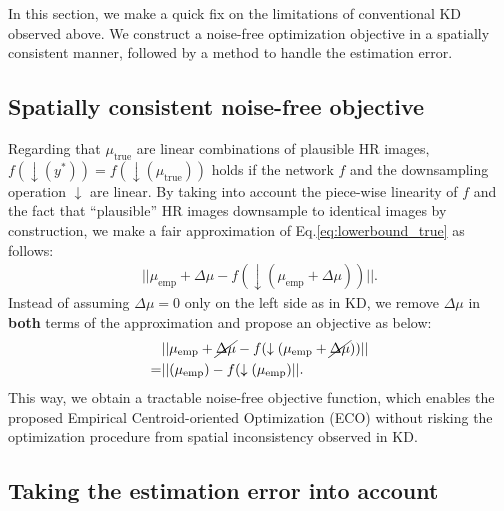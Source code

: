 \documentclass[letterpaper]{article} %
\begin{document}
In this section, we make a quick fix on the limitations of conventional KD observed above. We construct a noise-free optimization objective in a spatially consistent manner, followed by a method to handle the estimation error. 

\subsection{Spatially consistent noise-free objective}
Regarding that $\mu_{\text{true}}$ are linear combinations of plausible HR images, $f(\downarrow(y^*))=f(\downarrow(\mu_{\text{true}}))$ holds if the network $f$ and the downsampling operation $\downarrow$ are linear. By taking into account the piece-wise linearity \cite{PiecewiseLinear} of $f$ and the fact that ``plausible'' HR images downsample to identical images by construction, we make a fair approximation of Eq.\eqref{eq:lowerbound_true} as follows:
\begin{equation}
    \label{eq:lowerbound_withlinearity_}
    \begin{aligned}
        ||\mu_{\text{emp}} + \Delta\mu - f(\downarrow(\mu_{\text{emp}} + \Delta\mu))||
        .
    \end{aligned}
\end{equation}
Instead of assuming $\Delta\mu=0$ only on the left side as in KD, we remove $\Delta\mu$ in \textbf{both} terms of the approximation and propose an objective as below:
\begin{equation}
    \label{eq:train_with_sr}
    \begin{aligned}
        &||\mu_{\text{emp}} + \cancel{\Delta\mu} - f(\downarrow(\mu_{\text{emp}} + \cancel{\Delta\mu}))|| \\
         =&||(\mu_{\text{emp}}) - f(\downarrow(\mu_{\text{emp}})||
         .
    \end{aligned}
\end{equation} 
This way, we obtain a tractable noise-free objective function, which enables the proposed Empirical Centroid-oriented Optimization (ECO) without risking the optimization procedure from spatial inconsistency observed in KD.  

\subsection{Taking the estimation error into account}\label{section:mixup_as_rescue}
\end{document}
